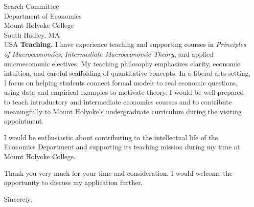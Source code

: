 \documentclass[11pt,letterpaper]{letter}
\begin{document}
\begin{letter}{Search Committee \\
Department of Economics \\
Mount Holyoke College \\
South Hadley, MA \\ USA}
\textbf{Teaching.} I have experience teaching and supporting courses in \textit{Principles of Macroeconomics}, \textit{Intermediate Macroeconomic Theory}, and applied macroeconomic electives. My teaching philosophy emphasizes clarity, economic intuition, and careful scaffolding of quantitative concepts. In a liberal arts setting, I focus on helping students connect formal models to real economic questions, using data and empirical examples to motivate theory. I would be well prepared to teach introductory and intermediate economics courses and to contribute meaningfully to Mount Holyoke’s undergraduate curriculum during the visiting appointment.

I would be enthusiastic about contributing to the intellectual life of the Economics Department and supporting its teaching mission during my time at Mount Holyoke College.

Thank you very much for your time and consideration. I would welcome the opportunity to discuss my application further.

\closing{Sincerely,}

\end{letter}
\end{document}
